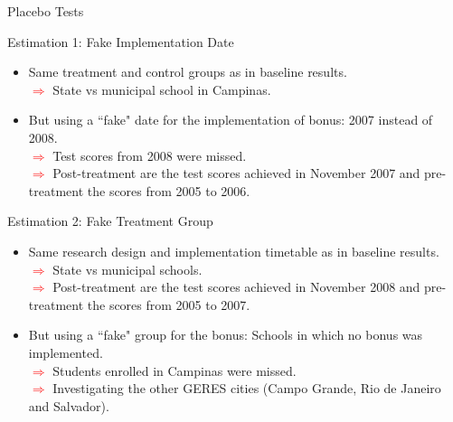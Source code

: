 \documentclass{beamer}
\begin{document}
\begin{frame} {Placebo Tests}
\begin{block}{\centering \Large Estimation 1: Fake Implementation Date}
\begin{itemize}
\item [\sbt] \scriptsize Same treatment and control groups as in baseline results. \\ \tiny \textcolor{red}{$\Longrightarrow$} State vs municipal school in Campinas.
\item [\sbt] \scriptsize But using a ``fake" date for the implementation of bonus: 2007 instead of 2008.
\\ \tiny\textcolor{red}{$\Longrightarrow$} Test scores from 2008 were missed.
\\ \tiny\textcolor{red}{$\Longrightarrow$} Post-treatment are the test scores achieved in November 2007 and pre-treatment the scores from 2005 to 2006. 

\end{itemize}
\end{block}

\vspace{0.7cm}
\begin{block}{\centering \Large Estimation 2: Fake Treatment Group}
\begin{itemize}
\item [\sbt] \scriptsize Same research design and implementation timetable as in baseline results.
\\ \tiny \textcolor{red}{$\Longrightarrow$} State vs municipal schools.
\\ \tiny \textcolor{red}{$\Longrightarrow$} Post-treatment are the test scores achieved in November 2008 and pre-treatment the scores from 2005 to 2007.
\item [\sbt] \scriptsize But using a ``fake" group for the bonus: Schools in which no bonus was implemented.
\\ \tiny\textcolor{red}{$\Longrightarrow$} Students enrolled in Campinas were missed.
\\ \tiny\textcolor{red}{$\Longrightarrow$} Investigating the other GERES cities (Campo Grande, Rio de Janeiro and Salvador).
\end{itemize}
\end{block}  
\end{frame}
\end{document}
